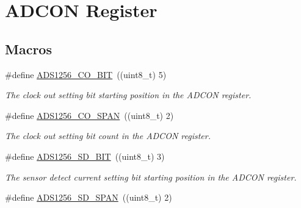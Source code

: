 \hypertarget{group__adcon__register}{\section{A\-D\-C\-O\-N Register}
\label{group__adcon__register}
}
\subsection*{Macros}
\begin{DoxyCompactItemize}
\item 
\hypertarget{group__adcon__register_ga5c128ef483f3f73486edc0926cfdd489}{\#define \hyperlink{group__adcon__register_ga5c128ef483f3f73486edc0926cfdd489}{A\-D\-S1256\-\_\-\-C\-O\-\_\-\-B\-I\-T}~((uint8\-\_\-t) 5)}\label{group__adcon__register_ga5c128ef483f3f73486edc0926cfdd489}

\begin{DoxyCompactList}\small\item\em The clock out setting bit starting position in the A\-D\-C\-O\-N register. \end{DoxyCompactList}\item 
\hypertarget{group__adcon__register_gaca76a3e75786c24c21dcc1f8b95d3c8f}{\#define \hyperlink{group__adcon__register_gaca76a3e75786c24c21dcc1f8b95d3c8f}{A\-D\-S1256\-\_\-\-C\-O\-\_\-\-S\-P\-A\-N}~((uint8\-\_\-t) 2)}\label{group__adcon__register_gaca76a3e75786c24c21dcc1f8b95d3c8f}

\begin{DoxyCompactList}\small\item\em The clock out setting bit count in the A\-D\-C\-O\-N register. \end{DoxyCompactList}\item 
\hypertarget{group__adcon__register_gae9ac3d875a51151679aa3bb5de911286}{\#define \hyperlink{group__adcon__register_gae9ac3d875a51151679aa3bb5de911286}{A\-D\-S1256\-\_\-\-S\-D\-\_\-\-B\-I\-T}~((uint8\-\_\-t) 3)}\label{group__adcon__register_gae9ac3d875a51151679aa3bb5de911286}

\begin{DoxyCompactList}\small\item\em The sensor detect current setting bit starting position in the A\-D\-C\-O\-N register. \end{DoxyCompactList}\item 
\hypertarget{group__adcon__register_ga7ccaedf1fc3255f7701cf9512d500a42}{\#define \hyperlink{group__adcon__register_ga7ccaedf1fc3255f7701cf9512d500a42}{A\-D\-S1256\-\_\-\-S\-D\-\_\-\-S\-P\-A\-N}~((uint8\-\_\-t) 2)}\label{group__adcon__register_ga7ccaedf1fc3255f7701cf9512d500a42}


\end{DoxyCompactItemize}
